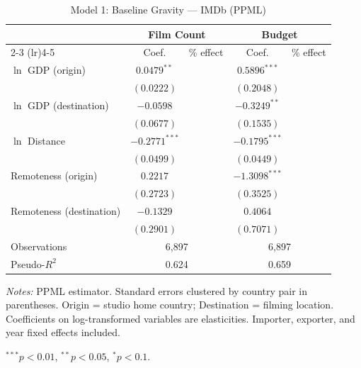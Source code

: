 

\begin{table}[htbp]
\centering
\caption{Model 1: Baseline Gravity --- IMDb (PPML)}
\label{tab:model1}
\small
\begin{tabular}{l cc cc}
\toprule
 & \multicolumn{2}{c}{Film Count} & \multicolumn{2}{c}{Budget} \\
\cmidrule(lr){2-3} \cmidrule(lr){4-5}
 & Coef. & \% effect & Coef. & \% effect \\
\midrule
$\ln$ GDP (origin) & $0.0479^{**}$ & & $0.5896^{***}$ & \\
 & $(0.0222)$ & & $(0.2048)$ & \\[4pt]
$\ln$ GDP (destination) & $-0.0598$ & & $-0.3249^{**}$ & \\
 & $(0.0677)$ & & $(0.1535)$ & \\[4pt]
$\ln$ Distance & $-0.2771^{***}$ & & $-0.1795^{***}$ & \\
 & $(0.0499)$ & & $(0.0449)$ & \\[4pt]
Remoteness (origin) & $0.2217$ & & $-1.3098^{***}$ & \\
 & $(0.2723)$ & & $(0.3525)$ & \\[4pt]
Remoteness (destination) & $-0.1329$ & & $0.4064$ & \\
 & $(0.2901)$ & & $(0.7071)$ & \\[4pt]
\midrule
Observations & \multicolumn{2}{c}{6,897} & \multicolumn{2}{c}{6,897} \\
Pseudo-$R^2$ & \multicolumn{2}{c}{0.624} & \multicolumn{2}{c}{0.659} \\
\bottomrule
\end{tabular}
\par\vspace{4pt}\noindent\begin{minipage}{\textwidth}
\footnotesize
\par \textit{Notes:} PPML estimator. Standard errors clustered by country pair in parentheses. Origin = studio home country; Destination = filming location. Coefficients on log-transformed variables are elasticities. Importer, exporter, and year fixed effects included.
\par $^{***}p<0.01$, $^{**}p<0.05$, $^{*}p<0.1$.
\end{minipage}
\end{table}


